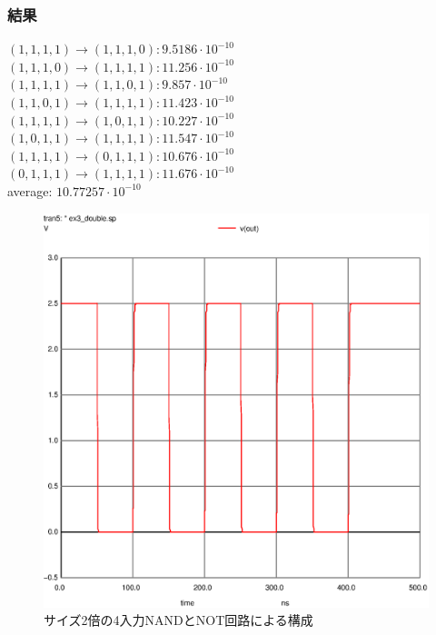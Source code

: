 \documentclass{jsarticle}
\begin{document}
\subsubsection{結果}
\begin{flushleft}
    $(1,1,1,1) \rightarrow (1,1,1,0) : 9.5186 \cdot 10^{-10}$\\
    $(1,1,1,0) \rightarrow (1,1,1,1) : 11.256 \cdot 10^{-10}$\\
    $(1,1,1,1) \rightarrow (1,1,0,1) : 9.857 \cdot 10^{-10}$\\
    $(1,1,0,1) \rightarrow (1,1,1,1) : 11.423 \cdot 10^{-10}$\\
    $(1,1,1,1) \rightarrow (1,0,1,1) : 10.227 \cdot 10^{-10}$\\
    $(1,0,1,1) \rightarrow (1,1,1,1) : 11.547 \cdot 10^{-10}$\\
    $(1,1,1,1) \rightarrow (0,1,1,1) : 10.676 \cdot 10^{-10}$\\
    $(0,1,1,1) \rightarrow (1,1,1,1) : 11.676 \cdot 10^{-10}$\\
    average: $10.77257 \cdot 10^{-10}$
    
    \end{flushleft}
    \begin{figure}[H]
        \hspace{50pt}
        \includegraphics[scale=0.8]{ex3_double.ps}
        \vspace{30pt}
        \caption{サイズ2倍の4入力NANDとNOT回路による構成}
    \end{figure}
\end{document}
